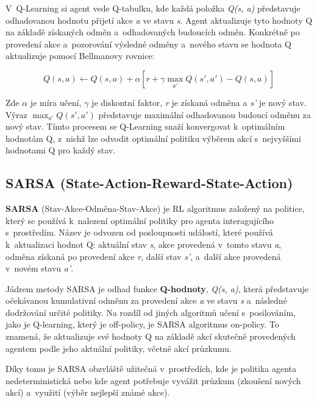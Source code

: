 V~Q-Learning si agent vede Q-tabulku, kde každá položka \textit{Q(s, a)} představuje odhadovanou hodnotu přijetí akce \textit{a} ve stavu \textit{s}. Agent aktualizuje tyto hodnoty Q na základě získaných odměn a~odhadovaných budoucích odměn. Konkrétně po provedení akce a~pozorování výsledné odměny a~nového stavu se hodnota Q aktualizuje pomocí Bellmanovy rovnice:

\begin{equation}
Q(s, a) \leftarrow Q(s, a) + \alpha \left[ r + \gamma \max_{a'} Q(s', a') - Q(s, a) \right]
\label{eq3.1}
\end{equation}

Zde $\alpha$ je míra učení, $\gamma$ je diskontní faktor, \textit{r} je získaná odměna a \textit{s'} je nový stav. Výraz \textit{$\max_{a'} Q(s', a')$} představuje maximální odhadovanou budoucí odměnu za nový stav. Tímto procesem se Q-Learning snaží konvergovat k~optimálním hodnotám Q, z~nichž lze odvodit optimální politiku výběrem akcí s~nejvyššími hodnotami Q pro každý stav.

\subsection{SARSA (State-Action-Reward-State-Action)}
\textbf{SARSA} (Stav-Akce-Odměna-Stav-Akce)\cite{Sutton1998} je RL algoritmus založený na politice, který se používá k~nalezení optimální politiky pro agenta interagujícího s~prostředím. Název  je odvozen od posloupnosti událostí, které používá k~aktualizaci hodnot Q: aktuální stav \textit{s}, akce provedená v~tomto stavu \textit{a}, odměna získaná po provedení akce \textit{r}, další stav \textit{s'}, a~další akce provedená v~novém stavu \textit{a'}.

Jádrem metody SARSA je odhad funkce \textbf{Q-hodnoty}, \textit{Q(s, a)}, která představuje očekávanou kumulativní odměnu za provedení akce \textit{a} ve stavu \textit{s} a~následné dodržování určité politiky. Na rozdíl od jiných algoritmů učení s~posilováním, jako je Q-learning, který je off-policy, je SARSA algoritmus on-policy. To znamená, že aktualizuje své hodnoty Q na základě akcí skutečně provedených agentem podle jeho aktuální politiky, včetně akcí průzkumu. 

\newpage

Díky tomu je SARSA obzvláště užitečná v~prostředích, kde je politika agenta nedeterministická nebo kde agent potřebuje vyvážit průzkum (zkoušení nových akcí) a~využití (výběr nejlepší známé akce).


